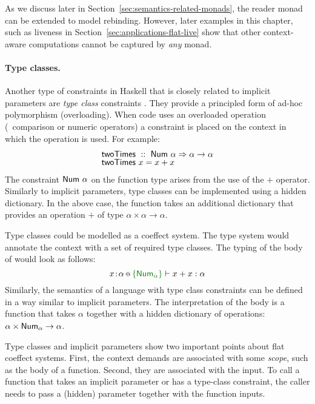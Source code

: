 As we discuss later in Section~\ref{sec:semantics-related-monads}, the reader monad can be extended
to model rebinding. However, later examples in this chapter, such as liveness in
Section~\ref{sec:applications-flat-live} show that other context-aware computations
cannot be captured by \emph{any} monad.


\paragraph{Type classes.}
Another type of constraints in Haskell that is closely related to implicit parameters are
\emph{type class} constraints \cite{app-type-classes}. They provide a principled form of ad-hoc
polymorphism (overloading). When code uses an overloaded operation (\eg~comparison or numeric
operators) a constraint is placed on the context in which the operation is used. For example:
%
\begin{equation*}
\begin{array}{l}
 \textnormal{\sffamily twoTimes}~::~\textnormal{\sffamily Num}~\alpha \Rightarrow \alpha \rightarrow \alpha \\[-0.25em]
 \textnormal{\sffamily twoTimes}~x=x+x
\end{array}
\end{equation*}
%
The constraint $\textnormal{\sffamily Num}~\alpha$ on the function type arises from the use of the $+$ operator.
Similarly to implicit parameters, type classes can be implemented using a hidden dictionary. In
the above case, the function  takes an additional dictionary that provides an operation
$+$ of type $\alpha \times \alpha \rightarrow \alpha$.

Type classes could be modelled as a coeffect system. The type system would annotate the context
with a set of required type classes. The typing of the body of  would look as
follows:
%
\begin{equation*}
\coctx{x\!:\!\alpha}{ \cclrd{\{ \ident{Num}_\alpha \}} } \vdash x + x : \alpha
\end{equation*}
%
Similarly, the semantics of a language with type class constraints can be defined in a way
similar to implicit parameters. The interpretation of the body is a function that takes $\alpha$
together with a hidden dictionary of operations: $\alpha \times \textnormal{\sffamily Num}_\alpha \rightarrow \alpha$.

Type classes and implicit parameters show two important points about flat coeffect systems.
First, the context demands are associated with some \emph{scope}, such as the body
of a function. Second, they are associated with the input. To call a function that takes an
implicit parameter or has a type-class constraint, the caller needs to pass a (hidden) parameter
together with the function inputs.

